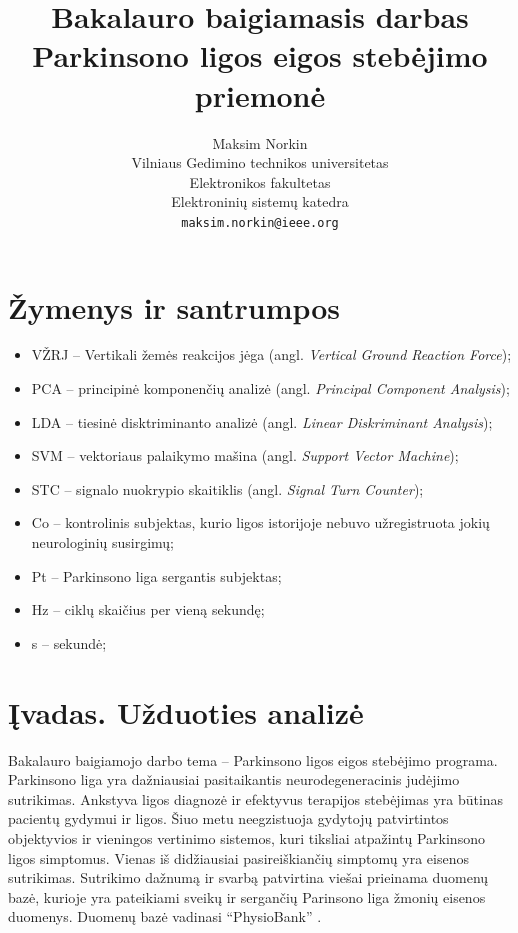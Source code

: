 \documentclass[]{vgtuef}
\author{Maksim Norkin\\Vilniaus Gedimino technikos universitetas\\Elektronikos fakultetas\\Elektroninių sistemų katedra\\\texttt{maksim.norkin@ieee.org}}
\title{Bakalauro baigiamasis darbas\\Parkinsono ligos eigos stebėjimo priemonė}
\begin{document}
\setcounter{page}{7}

\onehalfspacing


\tableofcontents

\section*{Žymenys ir santrumpos}

\begin{itemize}
\item VŽRJ -- Vertikali žemės reakcijos jėga (angl. \textit{Vertical Ground Reaction Force});
\item PCA -- principinė komponenčių analizė (angl. \textit{Principal Component Analysis});
\item LDA -- tiesinė disktriminanto analizė (angl. \textit{Linear Diskriminant Analysis});
\item SVM -- vektoriaus palaikymo mašina (angl. \textit{Support Vector Machine});
\item STC -- signalo nuokrypio skaitiklis (angl. \textit{Signal Turn Counter});
\item Co -- kontrolinis subjektas, kurio ligos istorijoje nebuvo užregistruota jokių neurologinių susirgimų;
\item Pt -- Parkinsono liga sergantis subjektas;
\item Hz -- ciklų skaičius per vieną sekundę;
\item s -- sekundė;
\end{itemize}

\section{Įvadas. Užduoties analizė}

Bakalauro baigiamojo darbo tema -- Parkinsono ligos eigos stebėjimo programa. Parkinsono liga yra dažniausiai pasitaikantis neurodegeneracinis judėjimo sutrikimas. Ankstyva ligos diagnozė ir efektyvus terapijos stebėjimas yra būtinas pacientų gydymui ir ligos. Šiuo metu neegzistuoja gydytojų patvirtintos objektyvios ir vieningos vertinimo sistemos, kuri tiksliai atpažintų Parkinsono ligos simptomus. Vienas iš didžiausiai pasireiškiančių simptomų yra eisenos sutrikimas. Sutrikimo dažnumą ir svarbą patvirtina viešai prieinama duomenų bazė, kurioje yra pateikiami sveikų ir sergančių Parinsono liga žmonių eisenos duomenys. Duomenų bazė vadinasi ``PhysioBank'' \cite{932728}.
\end{document}
